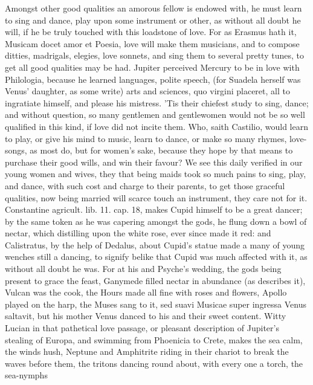 Amongst other good qualities an amorous fellow is endowed with, he must
learn to sing and dance, play upon some instrument or other, as without
all doubt he will, if he be truly touched with this loadstone of love.
For as Erasmus hath it, Musicam docet amor et Poesia, love will
make them musicians, and to compose ditties, madrigals, elegies, love
sonnets, and sing them to several pretty tunes, to get all good
qualities may be had. Jupiter perceived Mercury to be in love
with Philologia, because he learned languages, polite speech, (for
Suadela herself was Venus' daughter, as some write) arts and sciences,
quo virgini placeret, all to ingratiate himself, and please his
mistress. 'Tis their chiefest study to sing, dance; and without
question, so many gentlemen and gentlewomen would not be so well
qualified in this kind, if love did not incite them. Who, saith
Castilio, would learn to play, or give his mind to music, learn to
dance, or make so many rhymes, love-songs, as most do, but for women's
sake, because they hope by that means to purchase their good wills, and
win their favour? We see this daily verified in our young women and
wives, they that being maids took so much pains to sing, play, and
dance, with such cost and charge to their parents, to get those
graceful qualities, now being married will scarce touch an instrument,
they care not for it. Constantine agricult. lib. 11. cap. 18, makes
Cupid himself to be a great dancer; by the same token as he was
capering amongst the gods, he flung down a bowl of nectar, which
distilling upon the white rose, ever since made it red: and
Calistratus, by the help of Dedalus, about Cupid's statue made a
many of young wenches still a dancing, to signify belike that Cupid was
much affected with it, as without all doubt he was. For at his and
Psyche's wedding, the gods being present to grace the feast, Ganymede
filled nectar in abundance (as \Apuleius describes it), Vulcan was
the cook, the Hours made all fine with roses and flowers, Apollo played
on the harp, the Muses sang to it, sed suavi Musicae super ingressa
Venus saltavit, but his mother Venus danced to his and their sweet
content. Witty Lucian in that pathetical love passage, or
pleasant description of Jupiter's stealing of Europa, and swimming from
Phoenicia to Crete, makes the sea calm, the winds hush, Neptune and
Amphitrite riding in their chariot to break the waves before them, the
tritons dancing round about, with every one a torch, the sea-nymphs

